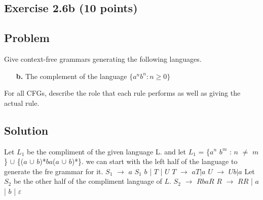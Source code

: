 \documentclass{article}
\begin{document}
\begin{empfile}
\section*{Exercise 2.6b (10 points)}

\subsection*{Problem}

Give context-free grammars generating the following languages.

\begin{enumerate}
\item[\textbf{b.}] The complement of the language $\{a^n b^n:n\geq 0\}$
\end{enumerate}

For all CFGs, describe the role that each rule performs as well as
giving the actual rule.

\subsection*{Solution}

Let $L_1$ be the compliment of the given language L.
and let $L_1$ = \{$a^n$ $b^m$ : $n$ $\neq$ $m$ \} $\cup$ \{($a$ $\cup$ $ b$)*$ba$($a$ $\cup$ $b$)*\}.\newline
we can start with the left half of the language to generate the fre grammar for it.\newline
$S_1$ $\rightarrow$ $a$ $S_1$ $b$ | $T$ | $U$ \newline
$T$ $\rightarrow$ $aT |a$\newline
$U$ $\rightarrow$ $Ub|a$ \newline
Let $S_2$ be the other half of the compliment language of $L$.\newline
$S_2$ $\rightarrow$ $RbaR$ \newline
$R$ $\rightarrow$ $RR$ | $a$ | $b$ | $\varepsilon$
\end{empfile}
\immediate{}
\end{document}
